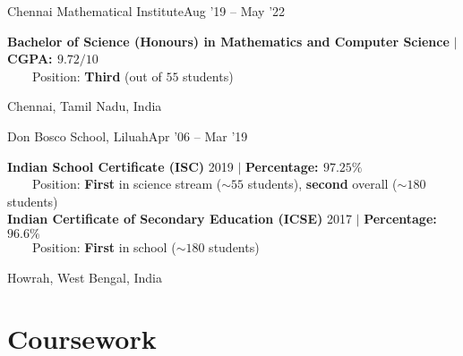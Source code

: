 \resumeSubheading
{Chennai Mathematical Institute}{Aug '19 -- May '22}
{\begin{minipage}{15cm} \color{grey}\textbf{Bachelor of Science (Honours) in Mathematics and Computer Science} $|$ \textbf{CGPA: $9.72/10$} \\
$\phantom{\qquad}$Position: \textbf{Third} (out of $55$ students) \end{minipage}
}{Chennai, Tamil Nadu, India}
\vspace{-5pt}
      
\resumeSubheading
{Don Bosco School, Liluah}{Apr '06 -- Mar '19}
{\begin{minipage}{15cm} \color{grey}\textbf{Indian School Certificate (ISC)} 2019 $|$ \textbf{Percentage: $97.25\%$} \\
$\phantom{\qquad}$Position: \textbf{First} in science stream ($\sim55$ students), \textbf{second} overall ($\sim180$ students) \\ 
\textbf{Indian Certificate of Secondary Education (ICSE)} 2017 $|$ \textbf{Percentage: $96.6\%$} \\
$\phantom{\qquad}$Position: \textbf{First} in school ($\sim180$ students) \end{minipage}
}{Howrah, West Bengal, India}

\section{Coursework}

